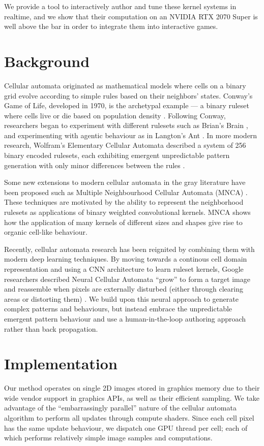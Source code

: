\documentclass[twocolumn]{article}
\begin{document}
We provide a tool to interactively author and tune these kernel systems in realtime, and we show that their computation on an NVIDIA RTX 2070 Super is well above the bar in order to integrate them into interactive games.
\section{Background}
Cellular automata originated as mathematical models where cells on a binary grid evolve according to simple rules based on their neighbors' states. Conway's Game of Life, developed in 1970, is the archetypal example --- a binary ruleset where cells live or die based on population density \cite{games1970fantastic}. Following Conway, researchers began to experiment with different rulesets such as Brian's Brain \cite{resnick1996exploring}, and experimenting with agentic behaviour as in Langton's Ant \cite{langton1986studying}. In more modern research, Wolfram's Elementary Cellular Automata described a system of 256 binary encoded rulesets, each exhibiting emergent unpredictable pattern generation with only minor differences between the rules \cite{weisstein2002elementary}.

Some new extensions to modern cellular automata in the gray literature have been proposed such as Multiple Neighbourhood Cellular Automata (MNCA) \cite{slackermanz2021understanding}. These techniques are motivated by the ability to represent the neighborhood rulesets as applications of binary weighted convolutional kernels. MNCA shows how the application of many kernels of different sizes and shapes give rise to organic cell-like behaviour.

Recently, cellular automata research has been reignited by combining them with modern deep learning techniques. By moving towards a continous cell domain representation and using a CNN architecture to learn ruleset kernels, Google researchers described Neural Cellular Automata ``grow'' to form a target image and reassemble when pixels are externally disturbed (either through clearing areas or distorting them) \cite{mordvintsev2020growing}. We build upon this neural approach to generate complex patterns and behaviours, but instead embrace the unpredictable emergent pattern behaviour and use a human-in-the-loop authoring approach rather than back propagation.

\section{Implementation}
Our method operates on single 2D images stored in graphics memory due to their wide vendor support in graphics APIs, as well as their efficient sampling. We take advantage of the ``embarrassingly parallel'' nature of the cellular automata algorithm to perform all updates through compute shaders. Since each cell pixel has the same update behaviour, we dispatch one GPU thread per cell; each of which performs relatively simple image samples and computations.
\end{document}
